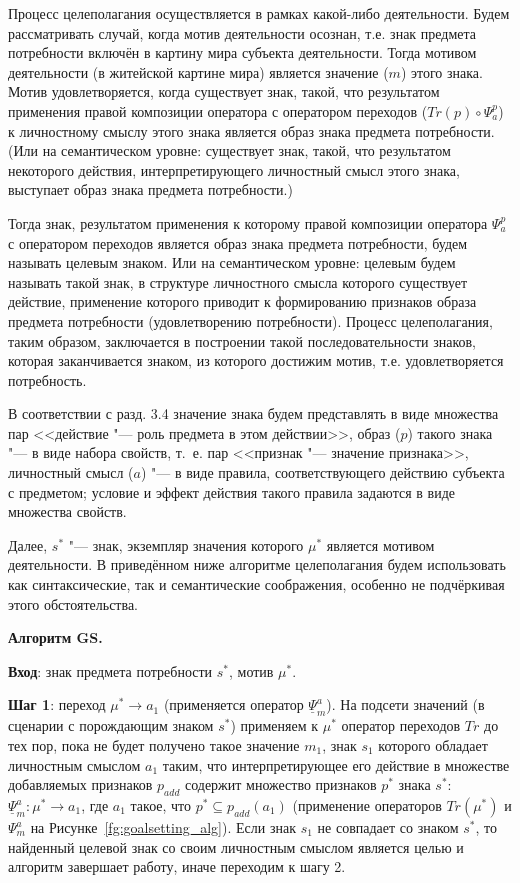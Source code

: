 \begin{appendices}
Процесс целеполагания осуществляется в рамках какой-либо деятельности. Будем рассматривать случай, когда мотив деятельности осознан, т.е. знак предмета потребности включён в картину мира субъекта деятельности. Тогда мотивом деятельности (в житейской картине мира) является значение ($m$) этого знака. Мотив удовлетворяется, когда существует знак, такой, что результатом применения правой композиции оператора   с оператором переходов ($Tr(p)\circ\Psi_a^p$) к личностному смыслу этого знака является образ знака предмета потребности. (Или на семантическом уровне: существует знак, такой, что результатом некоторого действия, интерпретирующего личностный смысл этого знака, выступает образ знака предмета потребности.)

Тогда знак, результатом применения к которому правой композиции оператора $\Psi_a^p$ с оператором переходов является образ знака предмета потребности, будем называть целевым знаком. Или на семантическом уровне: целевым будем называть такой знак, в структуре личностного смысла которого существует действие, применение которого приводит к формированию признаков образа предмета потребности (удовлетворению потребности). Процесс целеполагания, таким образом, заключается в построении такой последовательности знаков, которая заканчивается знаком, из которого достижим мотив, т.е. удовлетворяется потребность.

В соответствии с разд. 3.4 значение знака будем представлять в виде множества пар <<действие "--- роль предмета в этом действии>>, образ ($p$) такого знака "--- в виде набора свойств, т.~е. пар <<признак "--- значение признака>>, личностный смысл ($a$) "--- в виде правила, соответствующего действию субъекта с предметом; условие и эффект действия такого правила задаются в виде множества свойств.

Далее, $s^*$ "--- знак, экземпляр значения которого $\mu^*$ является мотивом деятельности. В приведённом ниже алгоритме целеполагания будем использовать как синтаксические, так и семантические соображения, особенно не подчёркивая этого обстоятельства.

\textbf{Алгоритм GS.}

\textbf{Вход}: знак предмета потребности $s^*$, мотив $\mu^*$.

\textbf{Шаг 1}: переход $\mu^*\rightarrow a_1$ (применяется оператор $\underline{\Psi}_m^a$). На подсети значений (в сценарии с порождающим знаком $s^*$) применяем к $\mu^*$ оператор переходов $Tr$ до тех пор, пока не будет получено такое значение $m_1$, знак $s_1$ которого обладает личностным смыслом $a_1$ таким, что интерпретирующее его действие в множестве добавляемых признаков $p_{add}$ содержит множество признаков $p^*$ знака $s^*$:  $\underline{\Psi}_m^a:\mu^*\rightarrow a_1$, где $a_1$ такое, что $p^*\subseteq p_{add}(a_1)$ (применение операторов $Tr(\mu^*)$ и $\Psi_m^a$ на Рисунке~\ref{fg:goalsetting_alg}). Если знак $s_1$ не совпадает со знаком $s^*$, то найденный целевой знак со своим личностным смыслом является целью и алгоритм завершает работу, иначе переходим к шагу 2.


\end{appendices}

